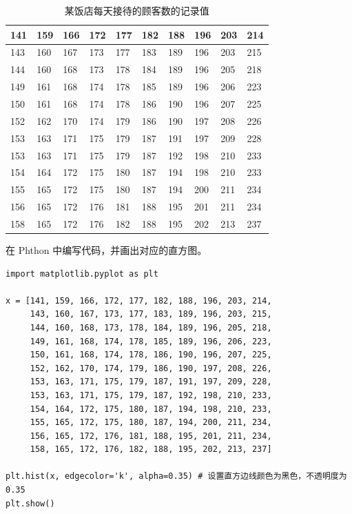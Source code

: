 \begin{table}[!ht]
\centering
\renewcommand{\arraystretch}{1.2}
\caption{某饭店每天接待的顾客数的记录值}
\begin{tabular}{|l|l|l|l|l|l|l|l|l|l|}
\hline

141 & 159 & 166 & 172 & 177 & 182 & 188 & 196 & 203 & 214 \\ \hline
143 & 160 & 167 & 173 & 177 & 183 & 189 & 196 & 203 & 215 \\ \hline
144 & 160 & 168 & 173 & 178 & 184 & 189 & 196 & 205 & 218 \\ \hline
149 & 161 & 168 & 174 & 178 & 185 & 189 & 196 & 206 & 223 \\ \hline
150 & 161 & 168 & 174 & 178 & 186 & 190 & 196 & 207 & 225 \\ \hline
152 & 162 & 170 & 174 & 179 & 186 & 190 & 197 & 208 & 226 \\ \hline
153 & 163 & 171 & 175 & 179 & 187 & 191 & 197 & 209 & 228 \\ \hline
153 & 163 & 171 & 175 & 179 & 187 & 192 & 198 & 210 & 233 \\ \hline
154 & 164 & 172 & 175 & 180 & 187 & 194 & 198 & 210 & 233 \\ \hline
155 & 165 & 172 & 175 & 180 & 187 & 194 & 200 & 211 & 234 \\ \hline
156 & 165 & 172 & 176 & 181 & 188 & 195 & 201 & 211 & 234 \\ \hline
158 & 165 & 172 & 176 & 182 & 188 & 195 & 202 & 213 & 237 \\ \hline

\end{tabular}
\end{table}

在 Phthon 中编写代码，并画出对应的直方图。

\clearpage
\begin{lstlisting}[Language=Python]
import matplotlib.pyplot as plt

x = [141, 159, 166, 172, 177, 182, 188, 196, 203, 214,
     143, 160, 167, 173, 177, 183, 189, 196, 203, 215,
     144, 160, 168, 173, 178, 184, 189, 196, 205, 218,
     149, 161, 168, 174, 178, 185, 189, 196, 206, 223,
     150, 161, 168, 174, 178, 186, 190, 196, 207, 225,
     152, 162, 170, 174, 179, 186, 190, 197, 208, 226,
     153, 163, 171, 175, 179, 187, 191, 197, 209, 228,
     153, 163, 171, 175, 179, 187, 192, 198, 210, 233,
     154, 164, 172, 175, 180, 187, 194, 198, 210, 233,
     155, 165, 172, 175, 180, 187, 194, 200, 211, 234,
     156, 165, 172, 176, 181, 188, 195, 201, 211, 234,
     158, 165, 172, 176, 182, 188, 195, 202, 213, 237]

plt.hist(x, edgecolor='k', alpha=0.35) # 设置直方边线颜色为黑色，不透明度为 0.35
plt.show()
\end{lstlisting}

